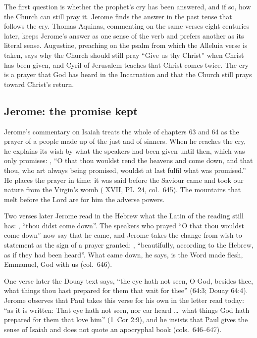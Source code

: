 \label{sec:rend-the-heavens}

The first question is whether the prophet's cry has been answered, and if
so, how the Church can still pray it. Jerome finds the answer in the past
tense that follows the cry. Thomas Aquinas, commenting on the same verses
eight centuries later, keeps Jerome's answer as one sense of the verb and
prefers another as its literal sense. Augustine, preaching on the psalm from
which the Alleluia verse is taken, says why the Church should still pray
``Give us thy Christ'' when Christ has been given, and Cyril of Jerusalem
teaches that Christ comes twice. The cry is a prayer that God has heard in
the Incarnation and that the Church still prays toward Christ's return.

\subsection{Jerome: the promise kept}

Jerome's commentary on Isaiah treats the whole of chapters 63 and 64 as the prayer of a
people made up of the just and of sinners. When he reaches the cry, he
explains its wish by what the speakers had been given until then, which was
only promises: , ``O that thou wouldst rend the
heavens and come down, and that thou, who art always being promised, wouldst
at last fulfil what was promised.'' He places the prayer in time: it was
said before the Saviour came and took our nature from the Virgin's womb
( XVII, PL~24, col.~645). The mountains that melt
before the Lord are for him the adverse powers.

Two verses later Jerome read in the Hebrew what the Latin of the reading
still has: , ``thou didst come down''. The speakers who
prayed ``O that thou wouldst come down'' now say that he came, and Jerome
takes the change from wish to statement as the sign of a prayer granted:
, ``beautifully,
according to the Hebrew, as if they had been heard''. What came down, he
says, is the Word made flesh, Emmanuel, God with us (col.~646).

One verse later the Douay text says, ``the eye hath not seen, O God, besides
thee, what things thou hast prepared for them that wait for thee'' (64:3;
Douay 64:4). Jerome observes that Paul takes this verse for his own
in the letter read today: ``as it is written: That eye hath not seen, nor ear
heard \ldots\ what things God hath prepared for them that love him'' (1~Cor
2:9), and he insists that Paul gives the sense of Isaiah and does not quote an
apocryphal book (cols.~646--647).

